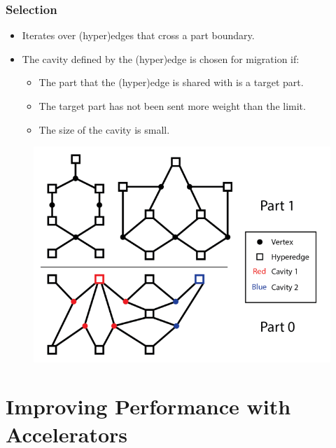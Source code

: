 \documentclass{beamer}
\begin{document}
\begin{frame}
  \frametitle{Selection}
  \begin{minipage}{.5\textwidth}
    \begin{itemize}
    \item Iterates over (hyper)edges that cross a part boundary.
      
    \item The cavity defined by the (hyper)edge is chosen for migration if:
      \begin{itemize}
      \item The part that the (hyper)edge is shared with is a target part.
      \item The target part has not been sent more weight than the limit.
      \item The size of the cavity is small.
      \end{itemize}
    \end{itemize}
  \end{minipage}
  \begin{minipage}{.45\textwidth}

    \begin{figure}
      \centering
      \includegraphics[width=\textwidth]{figures/PartBoundary.png}
    \end{figure}
  \end{minipage}
\end{frame}

\section{Improving Performance with Accelerators}
\end{document}
